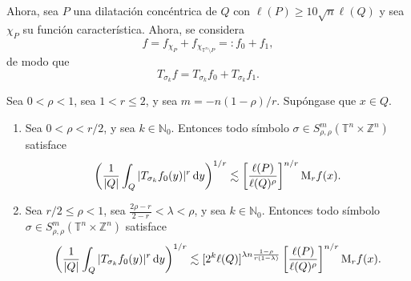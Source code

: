 Ahora, sea $P$ una dilatación concéntrica de $Q$ con $\ell(P)\geq 10\sqrt{n}\ell(Q)$ y sea $\chi_P$ su función característica. Ahora, se considera 
\begin{equation}
	f = f_{\chi_P} + f_{\chi_{\mathbb{T}^n\setminus P}} =: f_0 + f_1,
	\label{eq:decomposition}
\end{equation}
de modo que
\begin{equation*}
	T_{\sigma_k}f = T_{\sigma_k}f_0 + T_{\sigma_k}f_1.
\end{equation*}

\begin{proposition}
	Sea $0<\rho<1$, sea $1<r\leq2$, y sea $m=-n(1-\rho)/r$. Supóngase que $x\in Q$.
	
	\begin{enumerate}
		\item Sea $0<\rho<r/2$, y sea $k\in\mathbb{N}_0$. Entonces todo símbolo $\sigma \in S^m_{\rho,\rho}(\mathbb{T}^n \times \mathbb{Z}^n) $ satisface
		\begin{equation}
			\left( \frac{1}{|Q|}\int_Q |T_{\sigma_k} f_0(y)|^r\mathop{}\!\mathrm{d} y  
			\right)^{1/r} \lesssim \left[ \frac{\ell(P)}{\ell(Q)^\rho} 
			\right]^{n/r} \mathrm{M}_rf(x).
			\label{eq:fo-estimate-rho-less}
		\end{equation}
		\item Sea $r/2\leq \rho <1$, sea $ \frac{2\rho - r}{2-r} < \lambda < \rho$, y sea $k\in\mathbb{N}_0$. Entonces todo símbolo $\sigma \in S^m_{\rho,\rho}(\mathbb{T}^n \times \mathbb{Z}^n) $ satisface
		\begin{equation}
			\left( \frac{1}{|Q|}\int_Q|T_{\sigma_k}f_0(y)|^r \mathop{}\!\mathrm{d} y
			\right)^{1/r} \lesssim [2^k\ell(Q)]^{\lambda n \frac{1-\rho}{r(1-\lambda)}} \left[ \frac{\ell(P)}{\ell(Q)^\rho}
			\right]^{n/r} \mathrm{M}_rf(x).
			\label{eq:f0-estimate-rho-greater}
		\end{equation}
	\end{enumerate}
	
	
	
	
\end{proposition}
